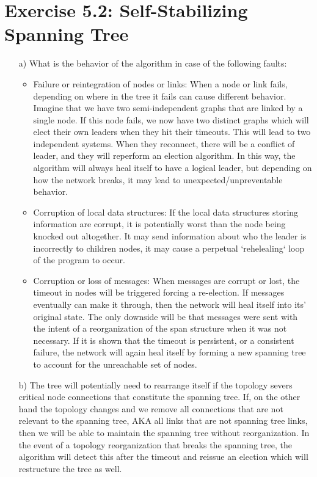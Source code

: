 \documentclass[12pt,a4paper]{article}
\begin{document}
\section*{Exercise 5.2: Self-Stabilizing Spanning Tree}
\begin{enumerate}

\item[a)] What is the behavior of the algorithm in case of the following faults:
  \begin{itemize}
  \item Failure or reintegration of nodes or links: When a node or link fails, depending on where in the tree it fails can cause different behavior. Imagine that we have two semi-independent graphs that are linked by a single node. If this node fails, we now have two distinct graphs which will elect their own leaders when they hit their timeouts. This will lead to two independent systems. When they reconnect, there will be a conflict of leader, and they will reperform an election algorithm. In this way, the algorithm will always heal itself to have a logical leader, but depending on how the network breaks, it may lead to unexpected/unpreventable behavior.
  \item Corruption of local data structures: If the local data structures storing information are corrupt, it is potentially worst than the node being knocked out altogether. It may send information about who the leader is incorrectly to children nodes, it may cause a perpetual `rehelealing` loop of the program to occur.
  \item Corruption or loss of messages: When messages are corrupt or lost, the timeout in nodes will be triggered forcing a re-election. If messages eventually can make it through, then the network will heal itself into its' original state. The only downside will be that messages were sent with the intent of a reorganization of the span structure when it was not necessary. If it is shown that the timeout is persistent, or a consistent failure, the network will again heal itself by forming a new spanning tree to account for the unreachable set of nodes.
  \end{itemize}
\item[b)] The tree will potentially need to rearrange itself if the topology severs critical node connections that constitute the spanning tree. If, on the other hand the topology changes and we remove all connections that are not relevant to the spanning tree, AKA all links that are not spanning tree links, then we will be able to maintain the spanning tree without reorganization. In the event of a topology reorganization that breaks the spanning tree, the algorithm will detect this after the timeout and reissue an election which will restructure the tree as well.

\end{enumerate}
\end{document}
